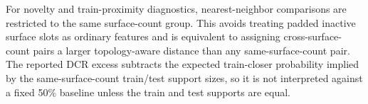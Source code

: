 For novelty and train-proximity diagnostics, nearest-neighbor comparisons are restricted to the same surface-count group. This avoids treating padded inactive surface slots as ordinary features and is equivalent to assigning cross-surface-count pairs a larger topology-aware distance than any same-surface-count pair. The reported DCR excess subtracts the expected train-closer probability implied by the same-surface-count train/test support sizes, so it is not interpreted against a fixed 50\% baseline unless the train and test supports are equal.
